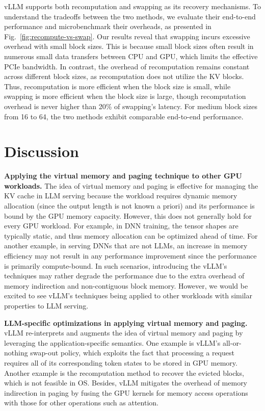 vLLM supports both recomputation and swapping as its recovery mechanisms. To understand the tradeoffs between the two methods, we evaluate their end-to-end performance and microbenchmark their overheads, as presented in Fig.~\ref{fig:recompute-vs-swap}.
Our results reveal that swapping incurs excessive overhead with small block sizes. This is because small block sizes often result in numerous small data transfers between CPU and GPU, which limits the effective PCIe bandwidth. In contrast, the overhead of recomputation remains constant across different block sizes, as recomputation does not utilize the KV blocks. Thus, recomputation is more efficient when the block size is small, while swapping is more efficient when the block size is large, though recomputation overhead is never higher than 20\% of swapping's latency. For medium block sizes from 16 to 64, the two methods exhibit comparable end-to-end performance.

\section{Discussion}

\textbf{Applying the virtual memory and paging technique to other GPU workloads.} The idea of virtual memory and paging is effective for managing the KV cache in LLM serving because the workload requires dynamic memory allocation (since the output length is not known a priori) and its performance is bound by the GPU memory capacity. However, this does not generally hold for every GPU workload. For example, in DNN training, the tensor shapes are typically static, and thus memory allocation can be optimized ahead of time. For another example, in serving DNNs that are not LLMs, an increase in memory efficiency may not result in any performance improvement since the performance is primarily compute-bound. In such scenarios, introducing the vLLM's techniques may rather degrade the performance due to the extra overhead of memory indirection and non-contiguous block memory. However, we would be excited to see vLLM's techniques being applied to other workloads with similar properties to LLM serving.

\textbf{LLM-specific optimizations in applying virtual memory and paging.} vLLM re-interprets and augments the idea of virtual memory and paging by leveraging the application-specific semantics. One example is vLLM's all-or-nothing swap-out policy, which exploits the fact that processing a request requires all of its corresponding token states to be stored in GPU memory. Another example is the recomputation method to recover the evicted blocks, which is not feasible in OS. Besides, vLLM mitigates the overhead of memory indirection in paging by fusing the GPU kernels for memory access operations with those for other operations such as attention.

